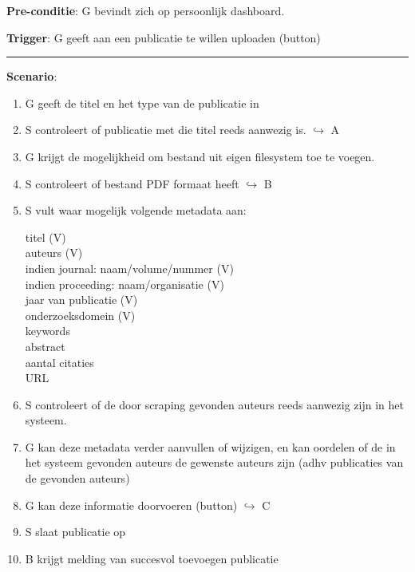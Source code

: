\noindent \textbf{Pre-conditie}: G bevindt zich op persoonlijk dashboard.  
\vspace{2 mm}

\noindent \textbf{Trigger}: G geeft aan een publicatie te willen uploaden (button)
\vspace{4 mm}



\hrule
\vspace{2 mm}
\noindent \textbf{Scenario}:
\begin{enumerate}
\item G geeft de titel en het type van de publicatie in 
\item S controleert of publicatie met die titel reeds aanwezig is.  $\hookrightarrow$ A
\item G krijgt de mogelijkheid om bestand uit eigen filesystem toe te voegen.
\item S controleert of bestand PDF formaat heeft $\hookrightarrow$ B
\item S vult waar mogelijk volgende metadata aan:
\begin{description}
  \item[titel (V)]  \hfill 
  \item[auteurs (V) ] \hfill 
  \item[indien journal: naam/volume/nummer (V)] \hfill 
  \item[indien proceeding: naam/organisatie (V)] \hfill 
  \item[jaar van publicatie (V) ] \hfill 
  \item[onderzoeksdomein (V)]  \hfill 
  \item[keywords]  \hfill 
  \item[abstract] \hfill 
   \item[aantal citaties] \hfill 
    \item[URL] \hfill 
  \end{description}
\item S controleert of de door scraping gevonden auteurs reeds aanwezig zijn in het systeem. 
\item G kan deze metadata verder aanvullen of wijzigen, en kan oordelen of de in het systeem gevonden auteurs de gewenste auteurs zijn (adhv publicaties van de gevonden auteurs) 
 \item G kan deze informatie doorvoeren (button)  $\hookrightarrow$ C
 \item S slaat publicatie op   
 \item B krijgt melding van succesvol toevoegen publicatie 
\end{enumerate}
